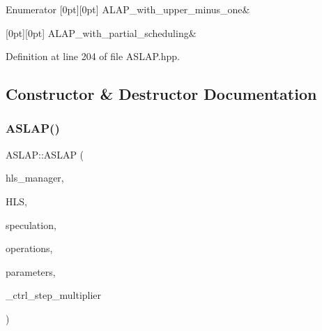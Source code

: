 \begin{DoxyEnumFields}{Enumerator}
[0pt][0pt]{}\mbox{\label{classASLAP_a091a7ef2aa403de3cabf4275cd1eb211a2763470ecdad26d244adf865e6c0ddb1}} 
A\+L\+A\+P\+\_\+with\+\_\+upper\+\_\+minus\+\_\+one&\\
\hline

[0pt][0pt]{}\mbox{\label{classASLAP_a091a7ef2aa403de3cabf4275cd1eb211a5bf0d563c223d2a3b6eb197aface4013}} 
A\+L\+A\+P\+\_\+with\+\_\+partial\+\_\+scheduling&\\
\hline

\end{DoxyEnumFields}


Definition at line 204 of file A\+S\+L\+A\+P.\+hpp.



\subsection{Constructor \& Destructor Documentation}
\mbox{\label{classASLAP_a08321649fa5caf4d06d4b874cb82bcf6}} 
\subsubsection{\texorpdfstring{A\+S\+L\+A\+P()}{ASLAP()}}
{\footnotesize\ttfamily A\+S\+L\+A\+P\+::\+A\+S\+L\+AP (\begin{DoxyParamCaption}\item[{const \hyperlink{hls__manager_8hpp_a1b481383e3beabc89bd7562ae672dd8c}{H\+L\+S\+\_\+manager\+Const\+Ref}}]{hls\+\_\+manager,  }\item[{const \hyperlink{hls_8hpp_a75d0c73923d0ddfa28c4843a802c73a7}{hls\+Ref}}]{H\+LS,  }\item[{const bool}]{speculation,  }\item[{const \hyperlink{classOpVertexSet}{Op\+Vertex\+Set} \&}]{operations,  }\item[{const \hyperlink{Parameter_8hpp_a37841774a6fcb479b597fdf8955eb4ea}{Parameter\+Const\+Ref}}]{parameters,  }\item[{unsigned int}]{\+\_\+ctrl\+\_\+step\+\_\+multiplier }\end{DoxyParamCaption})}



